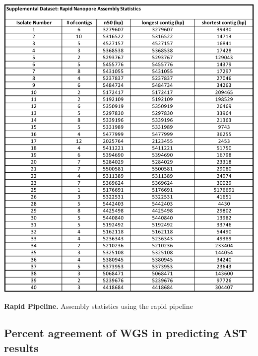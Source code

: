 \begin{table}[!hb]
\centering
\includegraphics[width = .85\linewidth,keepaspectratio]{figure/asmrapid.pdf}
\caption[Rapid Pipeline]{{\bf Rapid Pipeline.} Assembly statistics using the rapid pipeline }
\label{tab:asmrapid}
\end{table}




\subsection{Percent agreement of WGS in predicting AST results}
\label{sec:agree}

